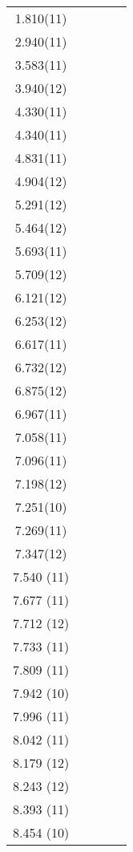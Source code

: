 \begin{center}
\begin{longtable}{cc cc c}
1.810(11)   &   &   &   &   \\
2.940(11)   &   &   &   &   \\
3.583(11)   &   &   &   &   \\
3.940(12)   &   &   &   &   \\
4.330(11)   &   &   &   &   \\
4.340(11)   &   &   &   &   \\
4.831(11)   &   &   &   &   \\
4.904(12)   &   &   &   &   \\
5.291(12)   &   &   &   &   \\
5.464(12)   &   &   &   &   \\
5.693(11)   &   &   &   &   \\
5.709(12)   &   &   &   &   \\
6.121(12)   &   &   &   &   \\
6.253(12)   &   &   &   &   \\
6.617(11)   &   &   &   &   \\
6.732(12)   &   &   &   &   \\
6.875(12)   &   &   &   &   \\
6.967(11)   &   &   &   &   \\
7.058(11)   &   &   &   &   \\
7.096(11)   &   &   &   &   \\
7.198(12)   &   &   &   &   \\
7.251(10)   &   &   &   &   \\
7.269(11)   &   &   &   &   \\
7.347(12)   &   &   &   &   \\
  7.540 (11)    &   &   &   &   \\
  7.677 (11)    &   &   &   &   \\
  7.712 (12)    &   &   &   &   \\
  7.733 (11)    &   &   &   &   \\
  7.809 (11)    &   &   &   &   \\
  7.942 (10)    &   &   &   &   \\
  7.996 (11)    &   &   &   &   \\
  8.042 (11)    &   &   &   &   \\
  8.179 (12)    &   &   &   &   \\
  8.243 (12)    &   &   &   &   \\
  8.393 (11)    &   &   &   &   \\
  8.454 (10)    &   &   &   &   \\

\end{longtable}
\end{center}
